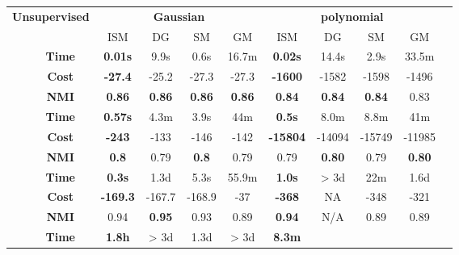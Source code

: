 \begin{table}[h]
	\scriptsize
	\centering
	\setlength{\tabcolsep}{3.0pt}
	\renewcommand{\arraystretch}{1.5}
	\begin{latin}
	\begin{tabular}{|cc|c|c|c|c|c|c|c|c|c|}
        \hline
		\multicolumn{2}{|c|}{\textbf{Unsupervised}} &
		\multicolumn{4}{|c|}{\textbf{Gaussian}} &
		\multicolumn{4}{|c|}{\textbf{polynomial}} \\
		\cline{3-10}
		& & ISM & DG & SM & GM & 
		ISM & DG & SM & GM \\

		\Xhline{2\arrayrulewidth}
		\parbox[t]{1mm}{}&
		\textbf{Time} & 
		\textbf{0.01s} & 
		9.9s & 
		0.6s & 
		16.7m & 
		\textbf{0.02s} & 
		14.4s &
		2.9s &
		33.5m \\
		&
		\textbf{Cost} & 
		\textbf{-27.4} & 
		-25.2 & 
		-27.3 & 
		-27.3 & 
		\textbf{-1600} & 
		-1582 & 
		-1598 & 
		-1496 \\
		&
		\textbf{NMI} & 
		\textbf{0.86} & 
		\textbf{0.86} & 
		\textbf{0.86} & 
		\textbf{0.86} & 
		\textbf{0.84} & 
		\textbf{0.84} & 
		\textbf{0.84} & 
		0.83 \\
		\hline
		\parbox[t]{1mm}{}&
		\textbf{Time} & 
		\textbf{0.57s} & 
		4.3m & 
		3.9s & 
		44m & 
		\textbf{0.5s} & 
		8.0m &
		8.8m &
		41m \\
		&
		\textbf{Cost} & 
		\textbf{-243} & 
		-133 & 
		-146 & 
		-142 & 
		\textbf{-15804} & 
		-14094& 
		-15749& 
		-11985\\                  
		&
		\textbf{NMI} & 
		\textbf{0.8} & 
		0.79 & 
		\textbf{0.8} & 
		0.79 & 
		0.79 & 
		\textbf{0.80} & 
		0.79 & 
		\textbf{0.80} \\
		\hline
		\parbox[t]{1mm}{}&
		\textbf{Time} & 
		\textbf{0.3s} & 
		1.3d & 
		5.3s & 
		55.9m & 
		\textbf{1.0s} & 
		> 3d &
		22m &
		1.6d\\
		&
		\textbf{Cost} & 
		\textbf{-169.3} & 
		-167.7 & 
		-168.9 & 
		-37 & 
		\textbf{-368} & 
		NA & 
		-348 & 
		-321 \\
		&
		\textbf{NMI} & 
		0.94 & 
		\textbf{0.95} & 
		0.93 & 
		0.89 & 
		\textbf{0.94} & 
		N/A & 
		0.89 & 
		0.89 \\
		\hline
		\parbox[t]{1mm}{}&
		\textbf{Time} & 
		\textbf{1.8h} & 
		> 3d &
		1.3d &
		> 3d &
		\textbf{8.3m} &

\end{tabular}
\end{latin}
\end{table}
